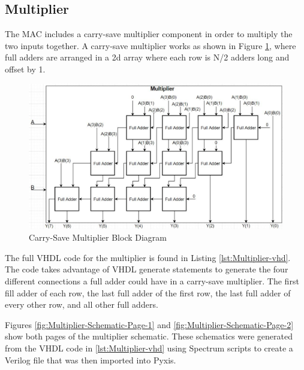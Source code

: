 \documentclass[11pt]{article}
\begin{document}
	\subsection{Multiplier}
	
	The MAC includes a carry-save multiplier component in order to multiply the two inputs together. A carry-save multiplier works as shown in Figure \ref{fig:multiplier-block-dia}, where full adders are arranged in a 2d array where each row is N/2 adders long and offset by 1.
		
		\begin{figure}[H]
			\centering
			\includegraphics[width=\textwidth,height=\dimexpr\textheight-4\baselineskip-\abovecaptionskip-\belowcaptionskip\relax,keepaspectratio]{Pictures/Multiplier}
			\caption{Carry-Save Multiplier Block Diagram}
			\label{fig:multiplier-block-dia}
		\end{figure}
		
	The full VHDL code for the multiplier is found in Listing \ref{lst:Multiplier-vhd}. The code takes advantage of VHDL generate statements to generate the four different connections a full adder could have in a carry-save multiplier. The first fill adder of each row, the last full adder of the first row, the last full adder of every other row, and all other full adders.
	
	Figures \ref{fig:Multiplier-Schematic-Page-1} and \ref{fig:Multiplier-Schematic-Page-2} show both pages of the multiplier schematic. These schematics were generated from the VHDL code in \ref{lst:Multiplier-vhd} using Spectrum scripts to create a Verilog file that was then imported into Pyxis.
	
\end{document}
